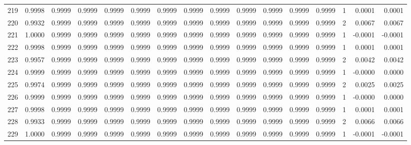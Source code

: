 \begin{tabular}{lrrrrrrrrrrrrrrr}
219 &      0.9998 &  0.9999 &  0.9999 &  0.9999 &  0.9999 &  0.9999 &  0.9999 &  0.9999 &  0.9999 &  0.9999 &   0.9999 &     0.9999 &      1 &                    0.0001 &                     0.0001 \\
220 &      0.9932 &  0.9999 &  0.9999 &  0.9999 &  0.9999 &  0.9999 &  0.9999 &  0.9999 &  0.9999 &  0.9999 &   0.9999 &     0.9999 &      2 &                    0.0067 &                     0.0067 \\
221 &      1.0000 &  0.9999 &  0.9999 &  0.9999 &  0.9999 &  0.9999 &  0.9999 &  0.9999 &  0.9999 &  0.9999 &   0.9999 &     0.9999 &      1 &                   -0.0001 &                    -0.0001 \\
222 &      0.9998 &  0.9999 &  0.9999 &  0.9999 &  0.9999 &  0.9999 &  0.9999 &  0.9999 &  0.9999 &  0.9999 &   0.9999 &     0.9999 &      1 &                    0.0001 &                     0.0001 \\
223 &      0.9957 &  0.9999 &  0.9999 &  0.9999 &  0.9999 &  0.9999 &  0.9999 &  0.9999 &  0.9999 &  0.9999 &   0.9999 &     0.9999 &      2 &                    0.0042 &                     0.0042 \\
224 &      0.9999 &  0.9999 &  0.9999 &  0.9999 &  0.9999 &  0.9999 &  0.9999 &  0.9999 &  0.9999 &  0.9999 &   0.9999 &     0.9999 &      1 &                   -0.0000 &                     0.0000 \\
225 &      0.9974 &  0.9999 &  0.9999 &  0.9999 &  0.9999 &  0.9999 &  0.9999 &  0.9999 &  0.9999 &  0.9999 &   0.9999 &     0.9999 &      2 &                    0.0025 &                     0.0025 \\
226 &      0.9999 &  0.9999 &  0.9999 &  0.9999 &  0.9999 &  0.9999 &  0.9999 &  0.9999 &  0.9999 &  0.9999 &   0.9999 &     0.9999 &      1 &                   -0.0000 &                     0.0000 \\
227 &      0.9998 &  0.9999 &  0.9999 &  0.9999 &  0.9999 &  0.9999 &  0.9999 &  0.9999 &  0.9999 &  0.9999 &   0.9999 &     0.9999 &      1 &                    0.0001 &                     0.0001 \\
228 &      0.9933 &  0.9999 &  0.9999 &  0.9999 &  0.9999 &  0.9999 &  0.9999 &  0.9999 &  0.9999 &  0.9999 &   0.9999 &     0.9999 &      2 &                    0.0066 &                     0.0066 \\
229 &      1.0000 &  0.9999 &  0.9999 &  0.9999 &  0.9999 &  0.9999 &  0.9999 &  0.9999 &  0.9999 &  0.9999 &   0.9999 &     0.9999 &      1 &                   -0.0001 &                    -0.0001 \\

\end{tabular}
